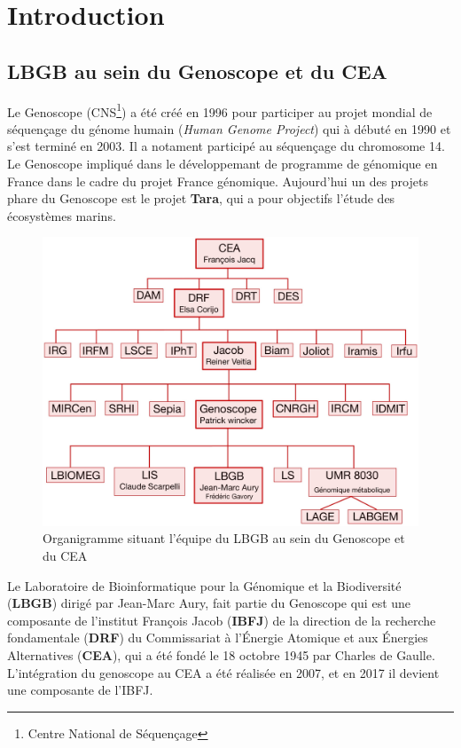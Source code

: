 \section{Introduction}
\subsection{LBGB au sein du Genoscope et du CEA}
Le Genoscope (CNS\footnote{Centre National de Séquençage}) a été créé en 1996 pour participer au projet mondial de séquençage du génome humain (\emph{Human Genome Project}) qui à débuté en 1990 et s'est terminé en 2003. Il a notament participé au séquençage du chromosome 14. Le Genoscope impliqué dans le développemant de programme de génomique en France dans le cadre du projet France génomique. Aujourd'hui un des projets phare du Genoscope est le projet \textbf{Tara}, qui a pour objectifs l'étude des écosystèmes marins.

\begin{minipage}{0.40\textwidth}
\begin{figure}[H]
    \centering
    \includegraphics[width=1\textwidth]{img/organigramme.jpg}
    \caption{Organigramme situant l’équipe du LBGB au sein du Genoscope et du CEA}
    \label{organigramme_LBGB}
\end{figure}
\end{minipage} 
\hfill
\begin{minipage}{0.5\textwidth}
    Le Laboratoire de Bioinformatique pour la Génomique et la Biodiversité (\textbf{LBGB}) dirigé par Jean-Marc Aury, fait partie du Genoscope qui est une composante de l'institut François Jacob (\textbf{IBFJ}) de la direction de la recherche fondamentale (\textbf{DRF}) du Commissariat à l'Énergie Atomique et aux Énergies Alternatives (\textbf{CEA}), qui a été fondé le 18 octobre 1945 par Charles de Gaulle. L'intégration du genoscope au CEA a été réalisée en 2007, et en 2017 il devient une composante de l'IBFJ.
\end{minipage}

